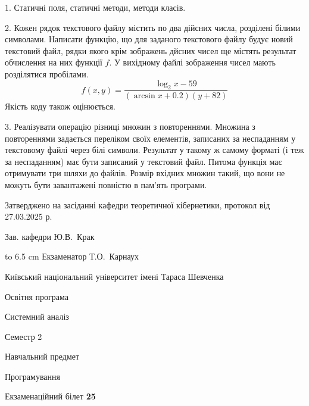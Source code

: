 \documentclass[12pt, ukrainian]{article}
\begin{document}
{%
1. Статичні поля, статичні методи, методи класів.%
\par
\vspace{2mm}

2. Кожен рядок текстового файлу містить по два дійсних числа, розділені білими символами.
Написати функцію, що для заданого текстового файлу будує новий текстовий файл, рядки якого крім зображень дйсних чисел ще містять результат обчислення на них функції $f$. У вихідному файлі зображення чисел мають розділятися пробілами. 
$$f(x, y) =\frac{\log_{2} x - 59}{(\arcsin x + 0.2) (y + 82)}$$ 
Якість коду також оцінюється.

\par
\vspace{2mm}

3. Реалізувати операцію різниці множин з повтореннями. Множина з повтореннями задається переліком своїх елементів, записаних за неспаданням у текстовому файлі через білі символи. Результат у такому ж самому форматі (і теж за неспаданням) має бути записаний у текстовий файл. Питома функція має отримувати три шляхи до файлів. Розмір вхідних множин такий, що вони не можуть бути завантажені повністю в пам’ять програми.

}
{\smallskip\smallskip \begin {scriptsize} Затверджено на засіданні кафедри теоретичної кібернетики, протокол   від   27.03.2025 р.\par\smallskip\smallskip\smallskip\smallskip
{\parbox {6.5 cm} {Зав. кафедри \dotfill Ю.В.~Крак}}\hspace {0.7cm} {\hbox to 6.5 cm { Екзаменатор \dotfill Т.О.~Карнаух}} \end{scriptsize}}
\newpage
{{\begin {scriptsize}\par
{ \center  Київський національний університет імені Тараса Шевченка \par}
{\parbox {5 cm}{Освітня програма \hfill}{\parbox {7 cm}{Системний аналіз\hfill}}\parbox {6 cm}{\hfill Семестр 2}}\par
{\parbox {5 cm} {Навчальний предмет \hfill}\parbox {7 cm}{Програмування \hfill}\parbox {6cm}{\hfill}\par}\vspace{-15pt} \end{scriptsize}}{\center Екзаменаційний білет \No \textbf { 25 }\par}}
\end{document}
